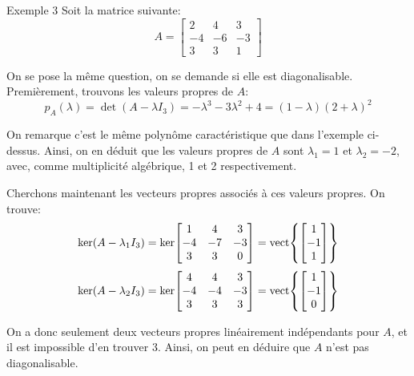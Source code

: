 \documentclass[a4paper]{article}
\begin{document}
\begin{parag}{Exemple 3}
    Soit la matrice suivante: 
    \[A = \begin{bmatrix} 2 & 4 & 3 \\ -4 & -6 & -3 \\ 3 & 3 & 1 \end{bmatrix} \]
    
    On se pose la même question, on se demande si elle est diagonalisable. Premièrement, trouvons les valeurs propres de $A$: 
    \[p_A\left(\lambda\right) = \det\left(A - \lambda I_3\right) = -\lambda^3 - 3\lambda^2 + 4 = \left(1 - \lambda\right)\left(2 + \lambda\right)^2\]
    
    On remarque c'est le même polynôme caractéristique que dans l'exemple ci-dessus. Ainsi, on en déduit que les valeurs propres de $A$ sont $\lambda_1 = 1$ et $\lambda_2 = -2$, avec, comme multiplicité algébrique, 1 et 2 respectivement.

    Cherchons maintenant les vecteurs propres associés à ces valeurs propres. On trouve: 
    \[\ker\left(A - \lambda_1 I_3\right) = \ker\begin{bmatrix} 1 & 4 & 3 \\ -4 & -7 & -3 \\ 3 & 3 & 0 \end{bmatrix} = \vect\left\{\begin{bmatrix} 1 \\ -1 \\ 1 \end{bmatrix} \right\}\]
    \[\ker\left(A - \lambda_2 I_3\right) = \ker\begin{bmatrix} 4 & 4 & 3 \\ -4 & -4 & -3 \\ 3 & 3 & 3 \end{bmatrix} = \vect\left\{\begin{bmatrix} 1 \\ -1 \\ 0 \end{bmatrix} \right\}\]
    
    On a donc seulement deux vecteurs propres linéairement indépendants pour $A$, et il est impossible d'en trouver 3. Ainsi, on peut en déduire que $A$ n'est pas diagonalisable.
\end{parag}
\end{document}

